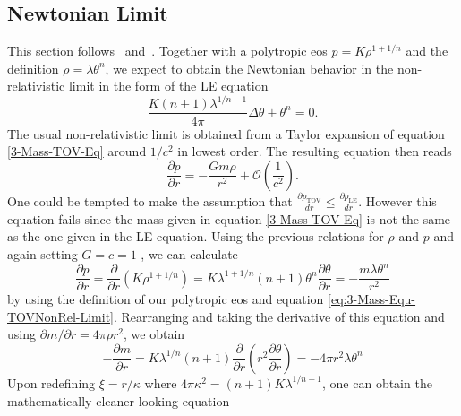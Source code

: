 \subsection{Newtonian Limit}
\label{subsec:3-Mass-Sec-LEDerivation}
This section follows~\cite{weissteinLaneEmdenDifferentialEquation2020} and~\cite[89\psqq]{chandrasekharChandrasekharAnIntroductionStudy1958}.
Together with a polytropic \ac{eos} $p=K\rho^{1+1/n}$ and the definition $\rho=\lambda\theta^n$, we expect to obtain the Newtonian behavior in the non-relativistic limit in the form of the \ac{LE} equation
\begin{equation}
	\frac{K(n+1)\lambda^{1/n-1}}{4\pi}\Delta\theta+\theta^n=0.
\end{equation}
The usual non-relativistic limit is obtained from a Taylor expansion of equation \eqref{3-Mass-TOV-Eq} around $1/c^2$ in lowest order.
The resulting equation then reads
\begin{equation}
	\frac{\partial p}{\partial r} = -\frac{Gm\rho}{r^2} + \mathcal{O}\left(\frac{1}{c^2}\right).
	\label{eq:3-Mass-Equ-TOVNonRel-Limit}
\end{equation}
One could be tempted to make the assumption that $\frac{\partial p_{\text{TOV}}}{dr} \leq \frac{\partial p_{\text{LE}}}{dr}.$ However this equation fails since the mass given in equation \eqref{3-Mass-TOV-Eq} is not the same as the one given in the \ac{LE} equation. Using the previous relations for $\rho$ and $p$ and again setting $G=c=1$ , we can calculate
\begin{equation}
	\frac{\partial p}{\partial r} = \frac{\partial}{\partial r}\left(K\rho^{1+1/n}\right)= K\lambda^{1+1/n}(n+1)\theta^n\frac{\partial\theta}{\partial r} = -\frac{m\lambda\theta^n}{r^2}
\end{equation}
by using the definition of our polytropic \ac{eos} and equation \eqref{eq:3-Mass-Equ-TOVNonRel-Limit}.
Rearranging and taking the derivative of this equation and using $\partial m/\partial r = 4\pi\rho r^2$, we obtain
\begin{equation}
	- \frac{\partial m}{\partial r} = K\lambda^{1/n}(n+1)\frac{\partial}{\partial r}\left(r^2\frac{\partial\theta}{\partial r}\right) = -4\pi r^2\lambda\theta^n
\end{equation}
Upon redefining $\xi=r/\kappa$ where $4\pi\kappa^2=(n+1)K\lambda^{1/n-1}$, one can obtain the mathematically cleaner looking equation
